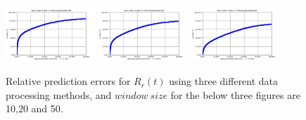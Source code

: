\documentclass[sigconf]{acmart}
\begin{document}
\begin{figure} 	
	\includegraphics[width=0.3\textwidth]{fig4/data-3-task-1-7030-windowsize10-RF.jpg} 
	\includegraphics[width=0.3\textwidth]{fig4/data-3-task-1-7030-windowsize20-RF.jpg}
	\includegraphics[width=0.3\textwidth]{fig4/data-3-task-1-7030-windowsize50-RF.jpg}
	\caption{Relative prediction errors for $R_r(t)$ using three different data processing methods, and $window\ size$ for the below three figures are 10,20 and 50.}
	\label{fig:task1_RF}  
\end{figure}
\end{document}
